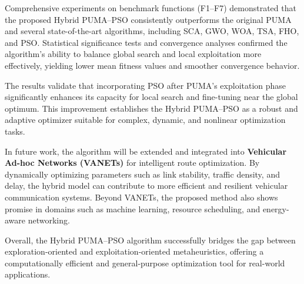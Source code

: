 \documentclass[a4paper,12pt]{article}
\begin{document}
Comprehensive experiments on benchmark functions (F1–F7) demonstrated that 
the proposed Hybrid PUMA–PSO consistently outperforms the original PUMA and several 
state-of-the-art algorithms, including SCA, GWO, WOA, TSA, FHO, and PSO. 
Statistical significance tests and convergence analyses confirmed the algorithm’s 
ability to balance global search and local exploitation more effectively, yielding 
lower mean fitness values and smoother convergence behavior. 

The results validate that incorporating PSO after PUMA’s exploitation phase 
significantly enhances its capacity for local search and fine-tuning near the global optimum. 
This improvement establishes the Hybrid PUMA–PSO as a robust and adaptive optimizer 
suitable for complex, dynamic, and nonlinear optimization tasks.

In future work, the algorithm will be extended and integrated into 
\textbf{Vehicular Ad-hoc Networks (VANETs)} for intelligent route optimization. 
By dynamically optimizing parameters such as link stability, traffic density, and delay, 
the hybrid model can contribute to more efficient and resilient vehicular communication systems. 
Beyond VANETs, the proposed method also shows promise in domains such as 
machine learning, resource scheduling, and energy-aware networking.

Overall, the Hybrid PUMA–PSO algorithm successfully bridges the gap between 
exploration-oriented and exploitation-oriented metaheuristics, offering a 
computationally efficient and general-purpose optimization tool for real-world applications.

\nocite{*}

\end{document}
